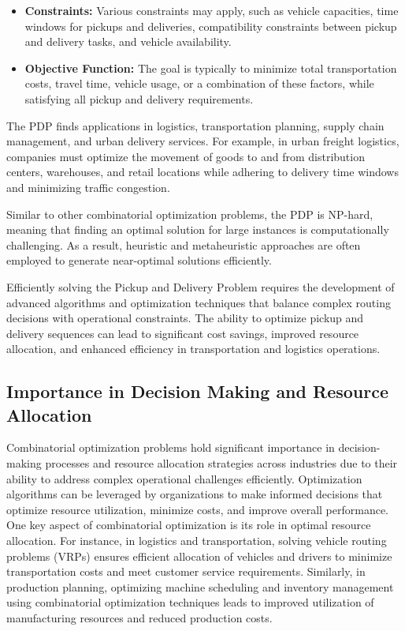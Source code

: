 \documentclass[11pt]{report}
\begin{document}
        \begin{itemize}
            \item \textbf{Constraints:} Various constraints may apply, such as vehicle capacities, time windows for pickups and deliveries, compatibility constraints between pickup and delivery tasks, and vehicle availability.
        
            \item \textbf{Objective Function:} The goal is typically to minimize total transportation costs, travel time, vehicle usage, or a combination of these factors, while satisfying all pickup and delivery requirements.
        \end{itemize}
        
        The PDP finds applications in logistics, transportation planning, supply chain management, and urban delivery services. For example, in urban freight logistics, companies must optimize the movement of goods to and from distribution centers, warehouses, and retail locations while adhering to delivery time windows and minimizing traffic congestion.
        
        Similar to other combinatorial optimization problems, the PDP is NP-hard, meaning that finding an optimal solution for large instances is computationally challenging. As a result, heuristic and metaheuristic approaches are often employed to generate near-optimal solutions efficiently.
        
        Efficiently solving the Pickup and Delivery Problem requires the development of advanced algorithms and optimization techniques that balance complex routing decisions with operational constraints. The ability to optimize pickup and delivery sequences can lead to significant cost savings, improved resource allocation, and enhanced efficiency in transportation and logistics operations.

        \subsection{Importance in Decision Making and Resource Allocation}
        Combinatorial optimization problems hold significant importance in decision-making processes and resource allocation strategies across industries due to their ability to address complex operational challenges efficiently. Optimization algorithms can be leveraged by organizations to make informed decisions that optimize resource utilization, minimize costs, and improve overall performance. One key aspect of combinatorial optimization is its role in optimal resource allocation. For instance, in logistics and transportation, solving vehicle routing problems (VRPs) ensures efficient allocation of vehicles and drivers to minimize transportation costs and meet customer service requirements. Similarly, in production planning, optimizing machine scheduling and inventory management using combinatorial optimization techniques leads to improved utilization of manufacturing resources and reduced production costs.
\end{document}

